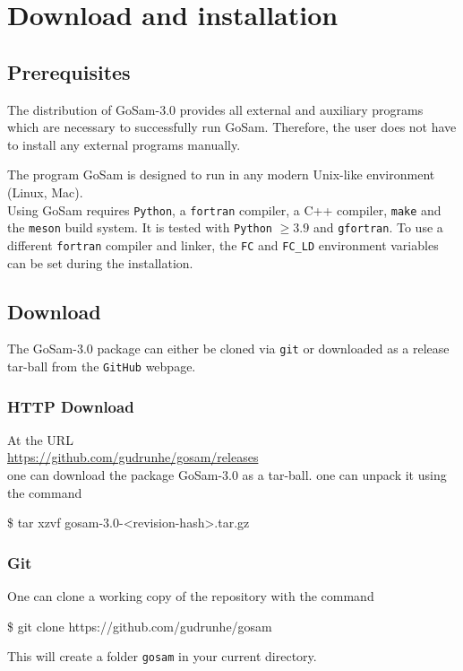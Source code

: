 \documentclass[11pt,a4paper]{refrep}
\newcommand{\gosamversion}{{3{.}0}}
\newcommand{\gosam}{{\sc GoSam}\xspace}
\newcommand{\packagename}{{gosam-\gosamversion-<revision-hash>}}
\begin{document}
\chapter{Download and installation}
\section{Prerequisites}

The distribution of \gosam-\gosamversion{} provides all external and auxiliary programs which are necessary 
to successfully run \gosam. 
Therefore, the user does not have to install any external programs manually.

The program \gosam is designed to run in any modern Unix-like environment (Linux, Mac).\\
Using \gosam requires \texttt{Python}, a \texttt{fortran} compiler, a C++ compiler, \texttt{make} and the \texttt{meson} build system. It is tested with \texttt{Python} $\geq 3.9$ and \texttt{gfortran}.
To use a different {\tt fortran} compiler and linker, the {\tt FC} and {\tt FC\_LD} environment variables can
be set during the installation.


\section{Download}

The \gosam-\gosamversion{} package can either be cloned 
via \texttt{git}
or downloaded as a release tar-ball from the {\tt GitHub} webpage.

\subsection*{HTTP Download}
At the URL \\
\url{https://github.com/gudrunhe/gosam/releases}\\
one can download the package
\gosam-\gosamversion{} as a tar-ball. 
one can unpack it using the command
\begin{example}
\$ tar xzvf \packagename{}.tar.gz
\end{example}

\subsection*{Git}
One can clone a working copy of the repository with the command
\begin{example}
\$ git clone https://github.com/gudrunhe/gosam
\end{example}
This will create a folder \texttt{gosam} in your current directory.
\end{document}
